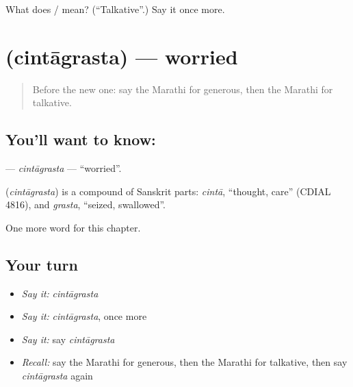 \begin{tcolorbox}[breakable,colback=teal!4,colframe=teal!35!black,title={Before you move on}]
What does  /  mean? (\textquotedblleft{}Talkative\textquotedblright{}.) Say it once more.
\end{tcolorbox}
\section[\texorpdfstring{\mr{चिंताग्रस्त} (cintāgrasta)}{चिंताग्रस्त (cintāgrasta)}]{ (cintāgrasta) — worried}

\label{lesson:MR-C260-cintagrasta}



\begin{quote}
Before the new one: say the Marathi for generous, then the Marathi for talkative.
\end{quote}

\subsection*{You'll want to know: }
\textbf{} — \emph{cintāgrasta} — \textquotedblleft{}worried\textquotedblright{}.

\begin{cousinweb}
\textbf{} (\emph{cintāgrasta}) is a compound of Sanskrit parts: \emph{cintā}, \textquotedblleft{}thought, care\textquotedblright{} (CDIAL 4816), and \emph{grasta}, \textquotedblleft{}seized, swallowed\textquotedblright{}.
\end{cousinweb}

\begin{grammarlens}[title={What you've built}]
One more word for this chapter.
\end{grammarlens}

\subsection*{Your turn}
\begin{itemize}
\raggedright
  \item \emph{Say it:} \emph{cintāgrasta}
  \item \emph{Say it:} \emph{cintāgrasta}, once more
  \item \emph{Say it:} say \emph{cintāgrasta}
  \item \emph{Recall:} say the Marathi for generous, then the Marathi for talkative, then say \emph{cintāgrasta} again
\end{itemize}

